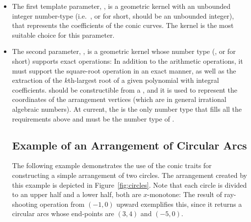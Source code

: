 \begin{itemize}
\item The first template parameter, , is a geometric kernel
with an unbounded integer number-type (i.e.~, or 
 for short, should be an unbounded integer), that represents the
coefficients of the conic curves. The kernel 
is the most suitable choice for this parameter.
\item The second parameter, , is a geometric kernel whose 
number type (, or  for short) supports exact
operations: In addition to the arithmetic operations, it must support the
square-root operation in an exact manner, as well as the extraction of the
$k$th-largest root of a given polynomial with integral coefficients.
 should be constructible from a , and it is used to
represent the coordinates of the arrangement vertices (which are in general
irrational algebraic numbers). At current, the  is the only
number type that fills all the requirements above and must be the number
type of .

\subsection{Example of an Arrangement of Circular Arcs}
\label{ssec:example3}
The following example demonstrates the use of the conic traits for 
constructing a simple arrangement of two circles. The arrangement created 
by this example is depicted in Figure~\ref{fig:circles}. Note that each
circle is divided to an upper half and a lower half, both are $x$-monotone:
The result of ray-shooting operation from $(-1,0)$ upward exemplifies this, 
since it returns a circular arcs whose end-points are $(3,4)$ and $(-5,0)$.


\end{itemize}
